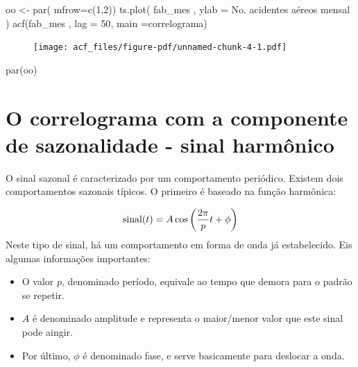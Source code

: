 \documentclass[
  letterpaper,
  DIV=11,
  numbers=noendperiod]{scrreprt}
\newenvironment{Shaded}{\begin{snugshade}}{\end{snugshade}}
\newcommand{\AttributeTok}[1]{\textcolor[rgb]{0.40,0.45,0.13}{#1}}
\newcommand{\DecValTok}[1]{\textcolor[rgb]{0.68,0.00,0.00}{#1}}
\newcommand{\FunctionTok}[1]{\textcolor[rgb]{0.28,0.35,0.67}{#1}}
\newcommand{\NormalTok}[1]{\textcolor[rgb]{0.00,0.23,0.31}{#1}}
\newcommand{\OtherTok}[1]{\textcolor[rgb]{0.00,0.23,0.31}{#1}}
\newcommand{\StringTok}[1]{\textcolor[rgb]{0.13,0.47,0.30}{#1}}
\begin{document}
\begin{Shaded}
\begin{Highlighting}[]
\NormalTok{oo }\OtherTok{\textless{}{-}} \FunctionTok{par}\NormalTok{( }\AttributeTok{mfrow=}\FunctionTok{c}\NormalTok{(}\DecValTok{1}\NormalTok{,}\DecValTok{2}\NormalTok{))}
\FunctionTok{ts.plot}\NormalTok{( fab\_mes , }\AttributeTok{ylab =} \StringTok{\textquotesingle{}No. acidentes aéreos mensal\textquotesingle{}}\NormalTok{ )}
\FunctionTok{acf}\NormalTok{(fab\_mes , }\AttributeTok{lag =} \DecValTok{50}\NormalTok{,  }\AttributeTok{main =}\StringTok{\textquotesingle{}correlograma\textquotesingle{}}\NormalTok{)}
\end{Highlighting}
\end{Shaded}

\begin{figure}[H]

{\centering \texttt{[image: acf\_files/figure-pdf/unnamed-chunk-4-1.pdf]}

}

\end{figure}

\begin{Shaded}
\begin{Highlighting}[]
\FunctionTok{par}\NormalTok{(oo)}
\end{Highlighting}
\end{Shaded}

\hypertarget{o-correlograma-com-a-componente-de-sazonalidade---sinal-harmuxf4nico}{%
\section{O correlograma com a componente de sazonalidade - sinal
harmônico}\label{o-correlograma-com-a-componente-de-sazonalidade---sinal-harmuxf4nico}}

O sinal sazonal é caracterizado por um comportamento periódico. Existem
dois comportamentos sazonais típicos. O primeiro é baseado na função
harmônica:

\[\hbox{sinal}(t)=A\cos\left(\frac{2\pi}{p}t + \phi\right)\] Neste tipo
de sinal, há um comportamento em forma de onda já estabelecido. Eis
algumas informações importantes:

\begin{itemize}
\item
  O valor \(p\), denominado período, equivale ao tempo que demora para o
  padrão se repetir.
\item
  \(A\) é denominado amplitude e representa o maior/menor valor que este
  sinal pode aingir.
\item
  Por último, \(\phi\) é denominado fase, e serve basicamente para
  deslocar a onda.
\end{itemize}
\end{document}
